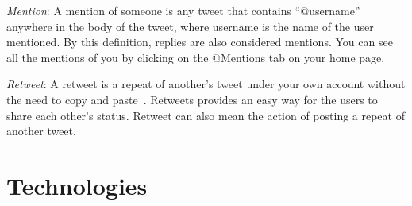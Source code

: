 \begin{description}
\begin{description}
\item \textit{Mention}: A mention of someone is any tweet that
  contains ``@username'' anywhere in the body of the tweet, where
  username is the name of the user mentioned. By this definition,
  replies are also considered mentions. You can see all the mentions
  of you by clicking on the @Mentions tab on your home page.

\item \textit{Retweet}: A retweet is a repeat of another’s tweet under
  your own account without the need to copy and paste~\cite{morris09}.
  Retweets provides an easy way for the users to share each other's
  status. Retweet can also mean the action of posting a repeat of
  another tweet.

\end{description}


\end{description}




\section{Technologies}



